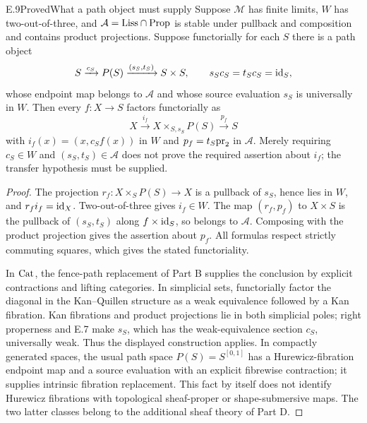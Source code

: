 \begin{claim}{E.9}{Proved}{What a path object must supply}
Suppose $\mathcal M$ has finite limits, $W$ has two-out-of-three, and $\mathcal A=\mathrm{Liss}\cap\mathrm{Prop}$ is stable under pullback and composition and contains product projections. Suppose functorially for each $S$ there is a path object
\[
 S\xrightarrow{c_S}P(S)\xrightarrow{(s_S,t_S)}S\times S,
 \qquad s_Sc_S=t_Sc_S=\mathrm{id}_S,
\]
whose endpoint map belongs to $\mathcal A$ and whose source evaluation $s_S$ is universally in $W$. Then every $f:X\to S$ factors functorially as
\[
 X\xrightarrow{i_f}X\times_{S,s_S}P(S)\xrightarrow{p_f}S
\]
with $i_f(x)=(x,c_Sf(x))$ in $W$ and $p_f=t_S\mathrm{pr}_2$ in $\mathcal A$. Merely requiring $c_S\in W$ and $(s_S,t_S)\in\mathcal A$ does not prove the required assertion about $i_f$; the transfer hypothesis must be supplied.
\end{claim}
\begin{proof}
The projection $r_f:X\times_SP(S)\to X$ is a pullback of $s_S$, hence lies in $W$, and $r_fi_f=\mathrm{id}_X$. Two-out-of-three gives $i_f\in W$. The map $(r_f,p_f)$ to $X\times S$ is the pullback of $(s_S,t_S)$ along $f\times\mathrm{id}_S$, so belongs to $\mathcal A$. Composing with the product projection gives the assertion about $p_f$. All formulas respect strictly commuting squares, which gives the stated functoriality.

In $\mathrm{Cat}$, the fence-path replacement of Part B supplies the conclusion by explicit contractions and lifting categories. In simplicial sets, functorially factor the diagonal in the Kan--Quillen structure as a weak equivalence followed by a Kan fibration. Kan fibrations and product projections lie in both simplicial poles; right properness and E.7 make $s_S$, which has the weak-equivalence section $c_S$, universally weak. Thus the displayed construction applies. In compactly generated spaces, the usual path space $P(S)=S^{[0,1]}$ has a Hurewicz-fibration endpoint map and a source evaluation with an explicit fibrewise contraction; it supplies intrinsic fibration replacement. This fact by itself does not identify Hurewicz fibrations with topological sheaf-proper or shape-submersive maps. The two latter classes belong to the additional sheaf theory of Part D.
\end{proof}


